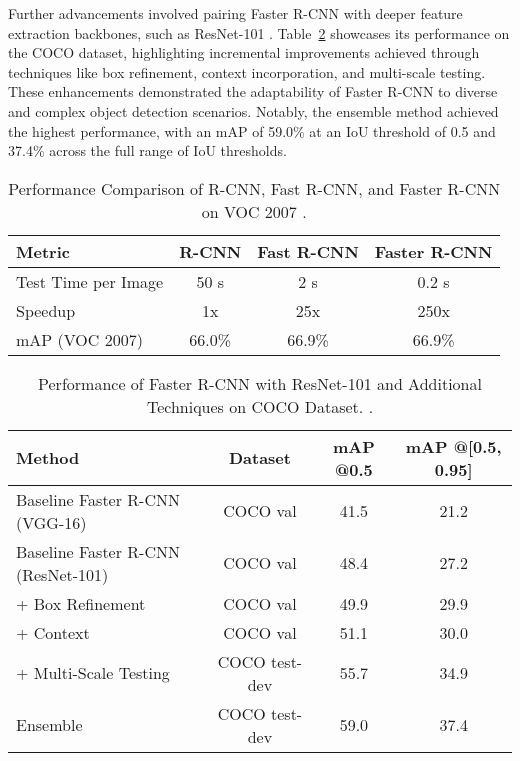 \documentclass[3p,times]{elsarticle}
\begin{document}
Further advancements involved pairing Faster R-CNN with deeper feature extraction backbones, such as ResNet-101 \citet{he2015deepresiduallearningimage}. Table~\ref{tab:resnet_faster_rcnn_results} showcases its performance on the COCO dataset, highlighting incremental improvements achieved through techniques like box refinement, context incorporation, and multi-scale testing. These enhancements demonstrated the adaptability of Faster R-CNN to diverse and complex object detection scenarios. Notably, the ensemble method achieved the highest performance, with an mAP of 59.0\% at an IoU threshold of 0.5 and 37.4\% across the full range of IoU thresholds.
\begin{table}[H]
\centering
\caption{Performance Comparison of R-CNN, Fast R-CNN, and Faster R-CNN on VOC 2007 \citet{ren2016fasterrcnnrealtimeobject}.}
\label{tab:faster_rcnn_results}
\begin{tabular}{|l|c|c|c|}
\hline
\textbf{Metric}         & \textbf{R-CNN} & \textbf{Fast R-CNN} & \textbf{Faster R-CNN} \\ \hline
Test Time per Image     & 50 s           & 2 s                 & 0.2 s                 \\ \hline
Speedup                 & 1x             & 25x                 & 250x                  \\ \hline
mAP (VOC 2007)          & 66.0\%         & 66.9\%              & 66.9\%                \\ \hline
\end{tabular}
\end{table}

\begin{table}[H]
\centering
\caption{Performance of Faster R-CNN with ResNet-101 and Additional Techniques on COCO Dataset. \citet{ren2016fasterrcnnrealtimeobject}.}
\label{tab:resnet_faster_rcnn_results}
\begin{tabular}{|l|c|c|c|}
\hline
\textbf{Method}                    & \textbf{Dataset} & \textbf{mAP @0.5} & \textbf{mAP @[0.5, 0.95]} \\ \hline
Baseline Faster R-CNN (VGG-16)     & COCO val         & 41.5              & 21.2                      \\ \hline
Baseline Faster R-CNN (ResNet-101) & COCO val         & 48.4              & 27.2                      \\ \hline
+ Box Refinement                   & COCO val         & 49.9              & 29.9                      \\ \hline
+ Context                          & COCO val         & 51.1              & 30.0                      \\ \hline
+ Multi-Scale Testing              & COCO test-dev    & 55.7              & 34.9                      \\ \hline
Ensemble                           & COCO test-dev    & 59.0              & 37.4                      \\ \hline
\end{tabular}
\end{table}
\end{document}
